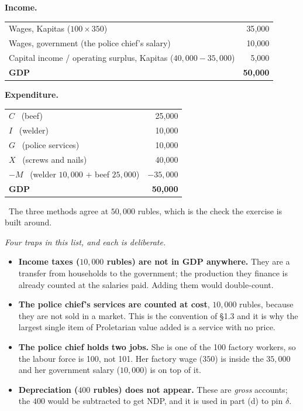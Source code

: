 \documentclass[12pt, letterpaper]{article}
\begin{document}
\begin{tcolorbox}[oddbox,title={Problem 5.7 \quad GDP Accounting, Interest Rates and Growth Accounting}]
\begin{enumerate}
\smallskip
\textbf{Income.}
\begin{center}
\begin{tabular}{@{}lr@{}}
\toprule
Wages, Kapitas ($100\times350$) & 35{,}000 \\
Wages, government (the police chief's salary) & 10{,}000 \\
Capital income / operating surplus, Kapitas ($40{,}000-35{,}000$) & 5{,}000 \\
\midrule
\textbf{GDP} & \textbf{50{,}000} \\
\bottomrule
\end{tabular}
\end{center}

\smallskip
\textbf{Expenditure.}
\begin{center}
\begin{tabular}{@{}lr@{}}
\toprule
$C$ \ (beef) & 25{,}000 \\
$I$ \ (welder) & 10{,}000 \\
$G$ \ (police services) & 10{,}000 \\
$X$ \ (screws and nails) & 40{,}000 \\
$-M$ \ (welder $10{,}000$ + beef $25{,}000$) & $-35{,}000$ \\
\midrule
\textbf{GDP} & \textbf{50{,}000} \\
\bottomrule
\end{tabular}
\end{center}
\checkmark\ The three methods agree at $50{,}000$ rubles, which is the check the exercise is
built around.

\smallskip
\emph{Four traps in this list, and each is deliberate.}
\begin{itemize}[leftmargin=1.3em,itemsep=2pt,topsep=3pt]
\item \textbf{Income taxes ($10{,}000$ rubles) are not in GDP anywhere.} They are a transfer
      from households to the government; the production they finance is already counted at
      the salaries paid. Adding them would double-count.
\item \textbf{The police chief's services are counted at cost}, $10{,}000$ rubles, because
      they are not sold in a market. This is the convention of \S1.3 and it is why the
      largest single item of Proletarian value added is a service with no price.
\item \textbf{The police chief holds two jobs.} She is one of the 100 factory workers, so
      the labour force is 100, not 101. Her factory wage ($350$) is inside the $35{,}000$
      and her government salary ($10{,}000$) is on top of it.
\item \textbf{Depreciation ($400$ rubles) does not appear.} These are \emph{gross} accounts;
      the $400$ would be subtracted to get NDP, and it is used in part (d) to pin $\delta$.
\end{itemize}


\end{enumerate}
\end{tcolorbox}
\end{document}
